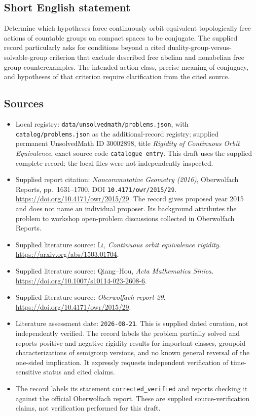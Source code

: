 \documentclass[11pt]{article}
\begin{document}
\subsection{Short English statement}
Determine which hypotheses force continuously orbit equivalent topologically free actions of countable groups on compact spaces to be conjugate. The supplied record particularly asks for conditions beyond a cited duality-group-versus-solvable-group criterion that exclude described free abelian and nonabelian free group counterexamples. The intended action class, precise meaning of conjugacy, and hypotheses of that criterion require clarification from the cited source.
\subsection{Sources}
\begin{itemize}
\item Local registry: \texttt{data/unsolvedmath/problems.json}, with \texttt{catalog/problems.json} as the additional-record registry; supplied permanent UnsolvedMath ID \(30002898\), title \emph{Rigidity of Continuous Orbit Equivalence}, exact source code \texttt{catalogue entry}. This draft uses the supplied complete record; the local files were not independently inspected.
\item Supplied report citation: \emph{Noncommutative Geometry (2016)}, Oberwolfach Reports, pp.\ 1631--1700, DOI \texttt{10.4171/owr/2015/29}. \url{https://doi.org/10.4171/owr/2015/29}. The record gives proposed year 2015 and does not name an individual proposer. Its background attributes the problem to workshop open-problem discussions collected in Oberwolfach Reports.
\item Supplied literature source: Li, \emph{Continuous orbit equivalence rigidity}. \url{https://arxiv.org/abs/1503.01704}.
\item Supplied literature source: Qiang--Hou, \emph{Acta Mathematica Sinica}. \url{https://doi.org/10.1007/s10114-023-2608-6}.
\item Supplied literature source: \emph{Oberwolfach report 29}. \url{https://doi.org/10.4171/owr/2015/29}.
\item Literature assessment date: \texttt{2026-08-21}. This is supplied dated curation, not independently verified. The record labels the problem partially solved and reports positive and negative rigidity results for important classes, groupoid characterizations of semigroup versions, and no known general reversal of the one-sided implication. It expressly requests independent verification of time-sensitive status and cited claims.
\item The record labels its statement \texttt{corrected\_verified} and reports checking it against the official Oberwolfach report. These are supplied source-verification claims, not verification performed for this draft.
\end{itemize}
\end{document}
